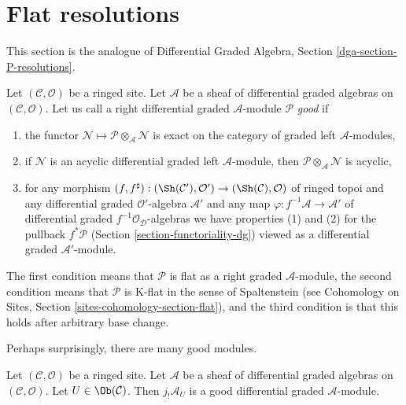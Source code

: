 \section{Flat resolutions}
\label{Section-P-resolutions}

\noindent
This section is the analogue of
Differential Graded Algebra, Section \ref{dga-section-P-resolutions}.

\medskip\noindent
Let $(\mathcal{C}, \mathcal{O})$ be a ringed site.
Let $\mathcal{A}$ be a sheaf of differential graded algebras
on $(\mathcal{C}, \mathcal{O})$. Let us call a right differential
graded $\mathcal{A}$-module $\mathcal{P}$ {\it good}
if
\begin{enumerate}
\item the functor
$\mathcal{N} \mapsto \mathcal{P} \otimes_\mathcal{A} \mathcal{N}$
is exact on the category of graded left $\mathcal{A}$-modules,
\item if $\mathcal{N}$ is an acyclic differential graded left
$\mathcal{A}$-module, then
$\mathcal{P} \otimes_\mathcal{A} \mathcal{N}$ is acyclic,
\item for any morphism $(f, f^\sharp) : (\Sh(\mathcal{C}'), \mathcal{O}')
\to (\Sh(\mathcal{C}), \mathcal{O})$
of ringed topoi and any differential graded $\mathcal{O}'$-algebra
$\mathcal{A}'$ and any map $\varphi : f^{-1}\mathcal{A} \to \mathcal{A}'$
of differential graded $f^{-1}\mathcal{O}_\mathcal{D}$-algebras we have
properties (1) and (2) for the pullback $f^*\mathcal{P}$
(Section \ref{section-functoriality-dg})
viewed as a differential graded $\mathcal{A}'$-module.
\end{enumerate}
The first condition means that $\mathcal{P}$ is flat as a right graded
$\mathcal{A}$-module, the second condition means that $\mathcal{P}$ is
K-flat in the sense of Spaltenstein (see Cohomology on
Sites, Section \ref{sites-cohomology-section-flat}), and
the third condition is that this holds after arbitrary base change.

\medskip\noindent
Perhaps surprisingly, there are many good modules.

\begin{lemma}
\label{lemma-supply-good}
Let $(\mathcal{C}, \mathcal{O})$ be a ringed site.
Let $\mathcal{A}$ be a sheaf of differential graded algebras
on $(\mathcal{C}, \mathcal{O})$. Let $U \in \Ob(\mathcal{C})$.
Then $j_!\mathcal{A}_U$ is a good differential graded
$\mathcal{A}$-module.
\end{lemma}

